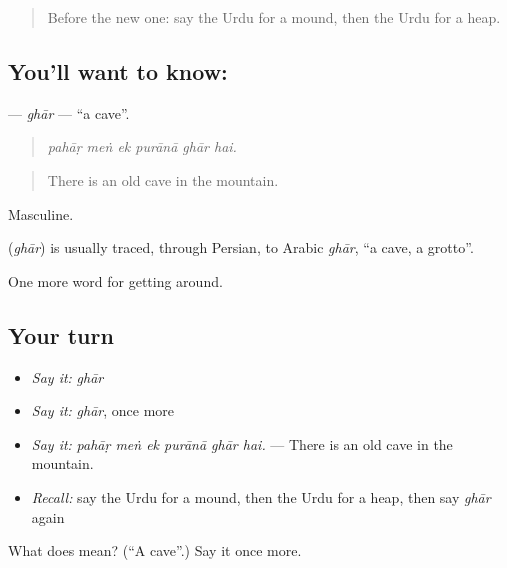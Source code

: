 \begin{quote}
Before the new one: say the Urdu for a mound, then the Urdu for a heap.
\end{quote}

\subsection*{You'll want to know: }
\textbf{} — \emph{ghār} — \textquotedblleft{}a cave\textquotedblright{}.

\begin{quote}
     
\end{quote}

\begin{quote}
\emph{pahāṛ meṅ ek purānā ghār hai.}
\end{quote}

\begin{quote}
There is an old cave in the mountain.
\end{quote}

Masculine.

\begin{cousinweb}
\textbf{} (\emph{ghār}) is usually traced, through Persian, to Arabic \emph{ghār}, \textquotedblleft{}a cave, a grotto\textquotedblright{}.
\end{cousinweb}

\begin{grammarlens}[title={What you've built}]
One more word for getting around.
\end{grammarlens}

\subsection*{Your turn}
\begin{itemize}
\raggedright
  \item \emph{Say it:} \emph{ghār}
  \item \emph{Say it:} \emph{ghār}, once more
  \item \emph{Say it:} \emph{pahāṛ meṅ ek purānā ghār hai.} — There is an old cave in the mountain.
  \item \emph{Recall:} say the Urdu for a mound, then the Urdu for a heap, then say \emph{ghār} again
\end{itemize}

\begin{tcolorbox}[breakable,colback=teal!4,colframe=teal!35!black,title={Before you move on}]
What does  mean? (\textquotedblleft{}A cave\textquotedblright{}.) Say it once more.
\end{tcolorbox}
